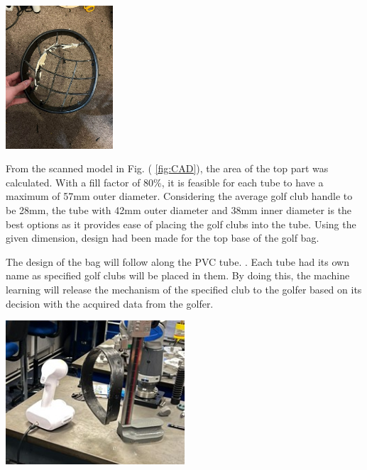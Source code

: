 \documentclass[11pt,landscape]{article}
\newenvironment{Figure}
  {\par\medskip\noindent\minipage{\linewidth}}
  {\endminipage\par\medskip}
\begin{document}
\begin{multicols}{3}
    \begin{Figure}
        \begin{center}
            \includegraphics[width=0.3\textwidth]{Figure2.jpg}
            \label{fig:top}
        \end{center}
    \end{Figure}
    
       From the scanned model in Fig. ( \ref{fig:CAD}), the area of the top part was calculated. With a fill factor of 80\%, it is feasible for each tube to have a
    maximum of 57mm outer diameter. Considering the average golf club handle to be 28mm, the tube 
    with 42mm outer diameter and 38mm inner diameter is the best options as it provides ease of
    placing the golf clubs into the tube. Using the given dimension, design had
    been made for the top base of the golf bag.
    
    The design of the bag will follow along the PVC tube.
. Each tube had its own name as specified
    golf clubs will be placed in them. By doing this, the machine learning will
    release the mechanism of the specified club to the golfer based on its
    decision with the acquired data from the golfer. 
        \begin{Figure}
        \begin{center}
            \includegraphics[width=0.5\textwidth]{Figure15.jpg}
            \label{fig:scan}
        \end{center}
    \end{Figure}
    

\end{multicols}
\end{document}
